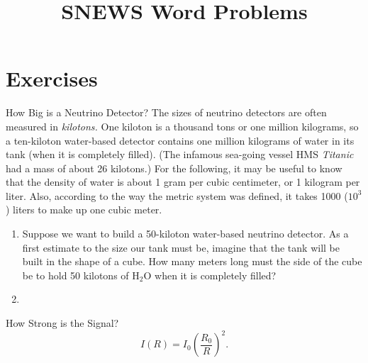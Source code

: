 \documentclass[12pt]{article}
\begin{document}
\title{SNEWS Word Problems}
\author{}
\date{}
\maketitle

\section{Exercises}

\begin{probdesc}{1}{How Big is a Neutrino Detector?}
The sizes of neutrino detectors are often measured in {\em kilotons.}
One kiloton is a thousand tons or one million kilograms, so a
ten-kiloton water-based detector contains one million kilograms of
water in its tank (when it is completely filled).  (The infamous
sea-going vessel HMS {\em Titanic} had a mass of about 26 kilotons.)
For the following, it may be useful to know that the density of water
is about 1 gram per cubic centimeter, or 1 kilogram per liter.  Also,
according to the way the metric system was defined, it takes 1000
($10^3$) liters to make up one cubic meter.

\begin{enumerate}
\item[(a)] Suppose we want to build a 50-kiloton water-based neutrino
  detector.  As a first estimate to the size our tank must be, imagine
  that the tank will be built in the shape of a cube.  How many meters
  long must the side of the cube be to hold 50 kilotons of H$_2$O when
  it is completely filled?

\item[(b)]
\end{enumerate}

\end{probdesc}

\begin{probdesc}{2}{How Strong is the Signal?}
\begin{equation}
I(R) = I_0 \left(\frac{R_0}{R}\right)^2.
\end{equation}
\end{probdesc}
\end{document}

